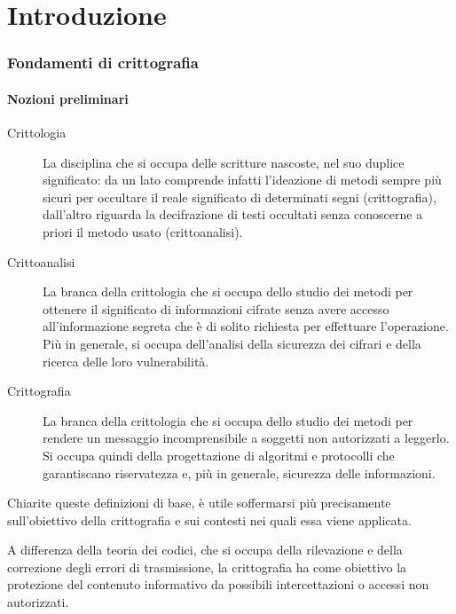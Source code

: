 \part{Introduzione}

\section{Fondamenti di crittografia}

\subsection{Nozioni preliminari}

\begin{description}
  \item[Crittologia] La disciplina che si occupa delle scritture nascoste, nel suo duplice significato: da un lato
    comprende infatti l'ideazione di metodi sempre più sicuri per occultare il reale significato di determinati segni
    (crittografia), dall'altro riguarda la decifrazione di testi occultati senza conoscerne a priori il metodo usato
    (crittoanalisi).
\end{description}

\begin{description}
  \item[Crittoanalisi] La branca della crittologia che si occupa dello studio dei metodi per ottenere il significato di
    informazioni cifrate senza avere accesso all'informazione segreta che è di solito richiesta per effettuare
    l'operazione. Più in generale, si occupa dell'analisi della sicurezza dei cifrari e della ricerca delle loro
    vulnerabilità.
\end{description}

\begin{description}
  \item[Crittografia] La branca della crittologia che si occupa dello studio dei metodi per rendere un messaggio
    incomprensibile a soggetti non autorizzati a leggerlo. Si occupa quindi della progettazione di algoritmi e
    protocolli che garantiscano riservatezza e, più in generale, sicurezza delle informazioni.
\end{description}

Chiarite queste definizioni di base, è utile soffermarsi più precisamente sull'obiettivo della crittografia e sui
contesti nei quali essa viene applicata.

A differenza della teoria dei codici, che si occupa della rilevazione e della correzione degli errori di trasmissione,
la crittografia ha come obiettivo la protezione del contenuto informativo da possibili intercettazioni o accessi non
autorizzati.

